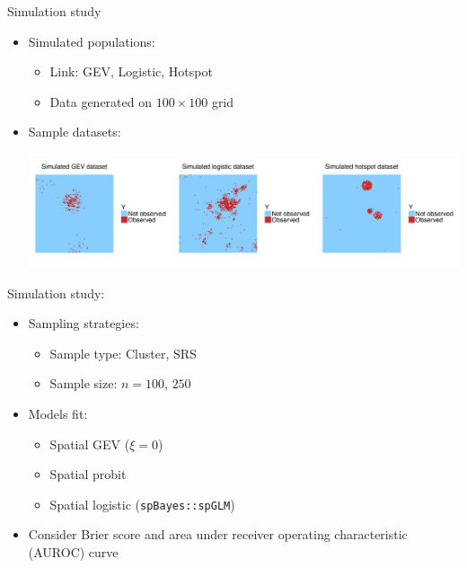 \documentclass{beamer}
\begin{document}
\begin{frame}{Simulation study}
	\begin{itemize} \setlength{\itemsep}{1em}
		\item Simulated populations: \vspace{0.5em}
		\begin{itemize} \setlength{\itemsep}{0.5em}
			\item Link: GEV, Logistic, Hotspot
			\item Data generated on $100 \times 100$ grid
		\end{itemize}
		\item Sample datasets:
		\begin{center}
		\includegraphics[width=\linewidth]{simulateddata.pdf}
		\end{center}
	\end{itemize}
\end{frame}

\begin{frame}{Simulation study:}
	\begin{itemize} \setlength{\itemsep}{1em}
		\item Sampling strategies: \vspace{0.5em}
		\begin{itemize} \setlength{\itemsep}{0.5em}
			\item Sample type: Cluster, SRS
			\item Sample size: $n = 100$, $250$
		\end{itemize}
		\item Models fit: \vspace{0.5em}
		\begin{itemize} \setlength{\itemsep}{0.5em}
			\item Spatial GEV ($\xi = 0$)
			\item Spatial probit
			\item Spatial logistic (\texttt{spBayes::spGLM})
		\end{itemize}
		\item Consider Brier score and area under receiver operating characteristic (AUROC) curve
	\end{itemize}
\end{frame}
\end{document}

